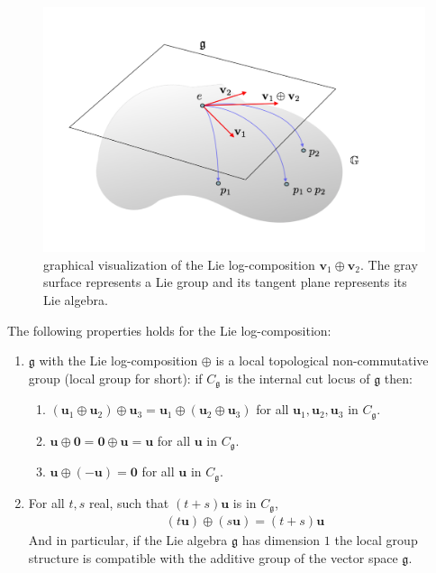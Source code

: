 \begin{figure}[!ht]
	\centering
	\includegraphics[scale=0.35]{figures/log_composition.pdf}
	\caption{graphical visualization of the Lie log-composition $\mathbf{v}_{1}\oplus \mathbf{v}_{2}$. The gray surface represents a Lie group and its tangent plane represents its Lie algebra. }
	\label{fig:composition}
\end{figure}

\noindent
The following properties holds for the Lie log-composition:
\begin{enumerate}
	\item $\mathfrak{g} $ with the Lie log-composition $\oplus$ is a local topological non-commutative group (local group for short): if $C_{\mathfrak{g}}$ is the internal cut locus of $\mathfrak{g}$ then:
	\begin{enumerate}
		\item $(\mathbf{u}_{1}\oplus\mathbf{u}_{2}) \oplus \mathbf{u}_{3}
		= \mathbf{u}_{1}\oplus(\mathbf{u}_{2} \oplus \mathbf{u}_{3})$ for all $\mathbf{u}_{1}, \mathbf{u}_{2}, \mathbf{u}_{3}$ in $C_{\mathfrak{g}}$.
		\item $\mathbf{u}\oplus\mathbf{0}  = \mathbf{0}\oplus\mathbf{u} = \mathbf{u}$ for all $\mathbf{u}$ in $C_{\mathfrak{g}}$.
		\item $\mathbf{u}\oplus(-\mathbf{u} ) = \mathbf{0}$ for all $\mathbf{u}$ in $C_{\mathfrak{g}}$.
	\end{enumerate}
	\item For all $t,s$ real, such that $(t+s)\mathbf{u}$ is in $C_{\mathfrak{g}}$,
	\begin{align*}
	(t\mathbf{u})\oplus (s\mathbf{u}) = (t+s)\mathbf{u}
	\end{align*}
	And in particular, if the Lie algebra $\mathfrak{g}$ has dimension $1$ the local group structure is compatible with the additive group of the vector space $\mathfrak{g}$.
\end{enumerate}

